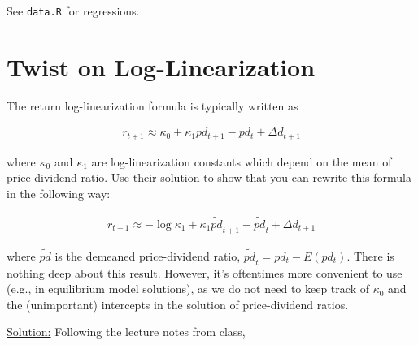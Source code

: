 \documentclass{article}
\begin{document}
\begin{enumerate}
\bigskip




\end{enumerate}

See \texttt{data.R} for regressions.

\pagebreak


\section{Twist on Log-Linearization}

The return log-linearization formula is typically written as

\begin{align}
r_{t+1} \approx \kappa_0 + \kappa_1 pd_{t+1} - pd_t + \Delta d_{t+1} \label{p3_ll1}
\end{align}

where $\kappa_0$ and $\kappa_1$ are log-linearization constants which depend on the mean of price-dividend ratio. Use their solution to show that you can rewrite this formula in the following way:

\begin{align}
r_{t+1} \approx - \log \kappa_1 + \kappa_1 \tilde{pd}_{t+1} - \tilde{pd}_t + \Delta d_{t+1} \label{p3_ll2}
\end{align}

where $\tilde{pd}$ is the demeaned price-dividend ratio, $\tilde{pd}_t = pd_t - E(pd_t)$.  There is nothing deep about this result. However, it's oftentimes more convenient to use (e.g., in equilibrium model solutions), as we do not need to keep track of $\kappa_0$ and the (unimportant) intercepts in the solution of price-dividend ratios.

\bigskip

\underline{Solution:} Following the lecture notes from class,
\end{document}
